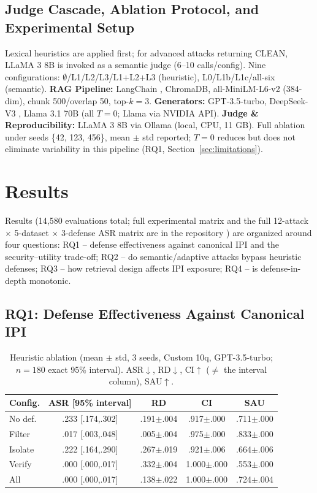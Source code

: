 \documentclass[conference]{IEEEtran}
\begin{document}
\subsection{Judge Cascade, Ablation Protocol, and Experimental Setup}

Lexical heuristics are applied first; for advanced attacks returning CLEAN, LLaMA 3 8B is invoked as a semantic judge (6--10 calls/config). Nine configurations: $\emptyset$/L1/L2/L3/L1+L2+L3 (heuristic), L0/L1b/L1c/all-six (semantic). \textbf{RAG Pipeline:} LangChain \cite{chase2022langchain}, ChromaDB, all-MiniLM-L6-v2 \cite{reimers2019sbert} (384-dim), chunk 500/overlap 50, top-$k=3$. \textbf{Generators:} GPT-3.5-turbo, DeepSeek-V3 \cite{deepseek2024v3}, Llama 3.1 70B \cite{grattafiori2024llama3} (all $T=0$; Llama via NVIDIA API). \textbf{Judge \& Reproducibility:} LLaMA 3 8B via Ollama (local, CPU, 11 GB). Full ablation under seeds \{42, 123, 456\}, mean $\pm$ std reported; $T=0$ reduces but does not eliminate variability in this pipeline (RQ1, Section~\ref{sec:limitations}).

\section{Results}

Results (14,580 evaluations total; full experimental matrix and the full 12-attack $\times$ 5-dataset $\times$ 3-defense ASR matrix are in the repository \cite{ameur2026repo}) are organized around four questions: RQ1 -- defense effectiveness against canonical IPI and the security--utility trade-off; RQ2 -- do semantic/adaptive attacks bypass heuristic defenses; RQ3 -- how retrieval design affects IPI exposure; RQ4 -- is defense-in-depth monotonic.

\subsection{RQ1: Defense Effectiveness Against Canonical IPI}

\begin{table}[t]
\centering
\caption{Heuristic ablation (mean $\pm$ std, 3 seeds, Custom 10q, GPT-3.5-turbo; $n=180$ exact 95\% interval). ASR$\downarrow$, RD$\downarrow$, CI$\uparrow$ ($\neq$ the interval column), SAU$\uparrow$.}
\label{tab:heuristic}
\footnotesize
\begin{tabular}{lcccc}
\toprule
Config. & ASR [95\% interval] & RD & CI & SAU \\
\midrule
No def. & .233 [.174,.302] & .191$\pm$.004 & .917$\pm$.000 & .711$\pm$.000 \\
Filter  & .017 [.003,.048] & .005$\pm$.004 & .975$\pm$.000 & .833$\pm$.000 \\
Isolate & .222 [.164,.290] & .267$\pm$.019 & .921$\pm$.006 & .664$\pm$.006 \\
Verify  & .000 [.000,.017] & .332$\pm$.004 & 1.000$\pm$.000 & .553$\pm$.000 \\
All     & .000 [.000,.017] & .138$\pm$.022 & 1.000$\pm$.000 & .724$\pm$.004 \\
\bottomrule
\end{tabular}
\end{table}
\end{document}
